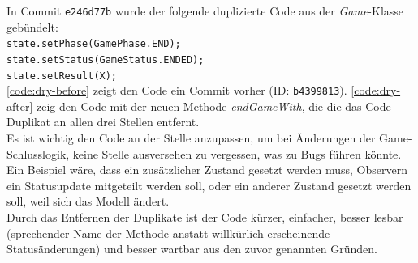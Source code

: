 In Commit \texttt{e246d77b} wurde der folgende duplizierte Code aus der \textit{Game}-Klasse gebündelt: \\
\texttt{state.setPhase(GamePhase.END);} \\
\texttt{state.setStatus(GameStatus.ENDED);} \\
\texttt{state.setResult(X);} \\
\autoref{code:dry-before} zeigt den Code ein Commit vorher (ID: \texttt{b4399813}).
\autoref{code:dry-after} zeig den Code mit der neuen Methode \textit{endGameWith}, die die das Code-Duplikat 
an allen drei Stellen entfernt. \\
Es ist wichtig den Code an der Stelle anzupassen, um bei Änderungen der Game-Schlusslogik, keine 
Stelle ausversehen zu vergessen, was zu Bugs führen könnte. Ein Beispiel wäre, dass ein zusätzlicher Zustand 
gesetzt werden muss, Observern ein Statusupdate mitgeteilt werden soll, oder ein anderer Zustand gesetzt 
werden soll, weil sich das Modell ändert. \\
Durch das Entfernen der Duplikate ist der Code kürzer, einfacher, besser lesbar (sprechender Name der Methode anstatt 
willkürlich erscheinende Statusänderungen) und besser wartbar aus den zuvor genannten Gründen.   







